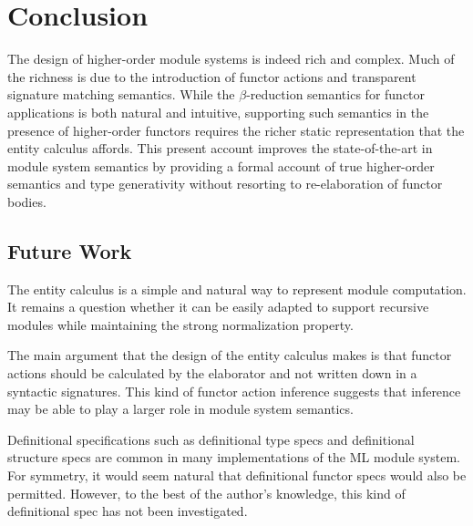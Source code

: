 \chapter{Conclusion}\label{ch:conclusion}

The design of higher-order module systems is indeed rich and complex. Much of the richness is due to the introduction of functor actions and transparent signature matching semantics. While the $\beta$-reduction semantics for functor applications is both natural and intuitive, supporting such semantics in the presence of higher-order functors requires the richer static representation that the entity calculus affords. This present account improves the state-of-the-art in module system semantics by providing a formal account of true higher-order semantics and type generativity without resorting to re-elaboration of functor bodies.  

\section{Future Work}\label{sec:futurework}

The entity calculus is a simple and natural way to represent module computation. It remains a question whether it can be easily adapted to support recursive modules while maintaining the strong normalization property. 

The main argument that the design of the entity calculus makes is that functor actions should be calculated by the elaborator and not written down in a syntactic signatures. This kind of functor action inference suggests that inference may be able to play a larger role in module system semantics. 

Definitional specifications such as definitional type specs and definitional structure specs are common in many implementations of the ML module system. For symmetry, it would seem natural that definitional functor specs would also be permitted. However, to the best of the author's knowledge, this kind of definitional spec has not been investigated. 

